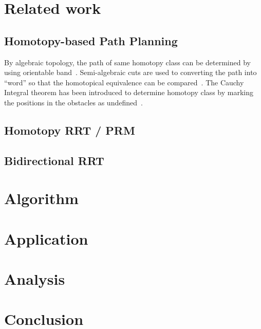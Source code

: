 \documentclass[letterpaper, 10 pt, conference]{ieeeconf}
\begin{document}
\section{Related work}
\label{sec:related_work}

\subsection{Homotopy-based Path Planning}

By algebraic topology, the path of same homotopy class can be determined by using orientable band~\cite{Hershberger199463}.
Semi-algebraic cuts are used to converting the path into ``word'' so that the homotopical equivalence can be compared~\cite{Grigoriev:1998:PAS:281508.281528}.
The Cauchy Integral theorem has been introduced to determine homotopy class by marking the positions in the obstacles as undefined~\cite{AAAI101920}.

\subsection{Homotopy RRT / PRM}

\cite{1041613}

\cite{Hernandez201544}

\subsection{Bidirectional RRT}


\cite{Jordan.Perez.ea:CSAIL13}

\cite{starek2014bidirectional}

\section{Algorithm}
\label{sec:algorithm}

\section{Application}
\label{sec:application}

\section{Analysis}
\label{sec:analysis}

\section{Conclusion}
\label{sec:conclusion}



\end{document}
